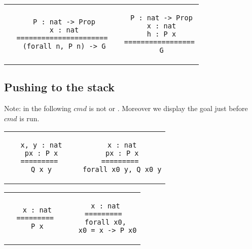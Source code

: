 \begin{landscape}
\begin{small}
\begin{multicols*}{3}[\begin{center}\section*{}\end{center}]
  \begin{tabular}{c@{$\to$}c}
  \begin{minipage}{0.17\textwidth}\begin{lstlisting}
   P : nat -> Prop
   x : nat
  ======================
   (forall n, P n) -> G
  \end{lstlisting}\end{minipage}
  &
  \begin{minipage}{0.20\textwidth}\begin{lstlisting}
   P : nat -> Prop
   x : nat
   h : P x
  =================
   G
  \end{lstlisting}\end{minipage}
  \end{tabular}

\subsection*{Pushing to the stack}
Note: in the following $cmd$ is not 
 or . Moreover we display the
goal just before $cmd$ is run.

  \begin{tabular}{c@{$\to$}c} 
  \begin{minipage}{0.15\textwidth}\begin{lstlisting}
   x, y : nat
   px : P x
  =========
   Q x y
  \end{lstlisting}\end{minipage}
  &
  \begin{minipage}{0.15\textwidth}\begin{lstlisting}
   x : nat
   px : P x
  =========
   forall x0 y, Q x0 y
  \end{lstlisting}\end{minipage}
  \end{tabular}

  \begin{tabular}{c@{$\to$}c} 
  \begin{minipage}{0.15\textwidth}\begin{lstlisting}
   x : nat
  =========
   P x
  \end{lstlisting}\end{minipage}
  &
  \begin{minipage}{0.15\textwidth}\begin{lstlisting}
   x : nat
  =========
   forall x0,
    x0 = x -> P x0
  \end{lstlisting}\end{minipage}
  \end{tabular}


\end{multicols*}
\end{small}
\end{landscape}
